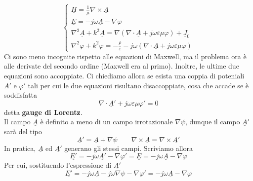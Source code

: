 \documentclass{book}
\begin{document}
            \begin{equation}
                \label{eqn:mi_servono1}
                \begin{cases}
                    \underline{H} = \frac{1}{\mu} \nabla \times \underline{A} \\
                    \underline{E} = -j \omega \underline{A}-\nabla \varphi \\
                    \nabla ^{2} \underline{A}+k^{2}\underline{A}= \nabla(\nabla \cdot \underline{A}+j \omega \varepsilon \mu \varphi)+\underline{J}_{0} \\
                    \displaystyle \nabla ^{2} \varphi +k^{2} \varphi = -\frac{\rho}{\varepsilon}-j \omega ( \nabla \cdot \underline{A}+j \omega \varepsilon \mu \varphi)
                \end{cases}
            \end{equation}
            Ci sono meno incognite rispetto alle equazioni di Maxwell, ma il problema ora è alle derivate del secondo ordine (Maxwell era al primo). Inoltre, le ultime due equazioni sono accoppiate.
            Ci chiediamo allora se esista una coppia di poteniali $\underline{A} '$ e $\varphi '$ tali per cui le due equazioni risultano disaccoppiate, cosa che accade se è soddisfatta
            \begin{equation}
                \nabla \cdot \underline{A} ' +j \omega \varepsilon \mu \varphi ' = 0
            \end{equation}
            detta \textbf{gauge di Lorentz}. \\
            Il campo $\underline{A}$ è definito a meno di un campo irrotazionale $\nabla \psi$, dunque il campo $\underline{A}'$ sarà del tipo
            \begin{equation}
                \underline{A}' = \underline{A}+\nabla \psi \qquad \nabla \times \underline{A} = \nabla \times \underline{A'}
            \end{equation}
            In pratica, $\underline{A}$ ed $\underline{A'}$ generano gli stessi campi. Scriviamo allora 
            \begin{equation}
                \label{eqn:mi_serve8}
                \underline{E'}= -j \omega \underline{A'} - \nabla \varphi' = \underline{E}= -j \omega \underline{A} - \nabla \varphi
            \end{equation}
            Per cui, sostituendo l'espressione di $\underline{A'}$
            \begin{equation}
                \underline{E'} = -j \omega \underline{A}-j \omega \nabla \psi - \nabla \varphi ' = -j \omega \underline{A}-\nabla \varphi
            \end{equation}
\end{document}
